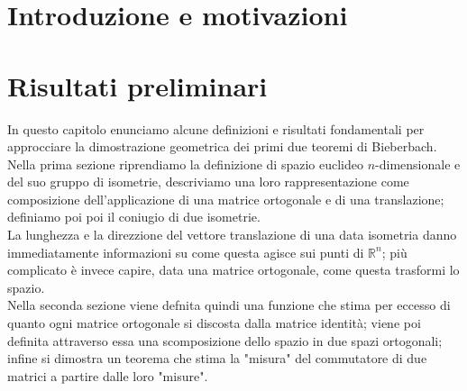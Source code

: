 \documentclass[12pt,a4paper]{book}
\author{Elisa Caruso}
\begin{document}
 

\chapter*{Introduzione e motivazioni}



\chapter{Risultati preliminari}
In questo capitolo enunciamo alcune definizioni e risultati fondamentali per approcciare la dimostrazione geometrica dei primi due teoremi di Bieberbach.  \\

Nella prima sezione riprendiamo la definizione di spazio euclideo $n$-dimensionale e del suo gruppo di isometrie, descriviamo una loro rappresentazione come composizione dell'applicazione di una matrice ortogonale e di una translazione; definiamo poi poi il coniugio di due isometrie. \\
La lunghezza e la direzzione del vettore translazione di una data isometria danno immediatamente informazioni su come questa agisce sui punti di $\mathbb{R}^n$; più complicato è invece capire, data una matrice ortogonale, come questa trasformi lo spazio. \\
Nella seconda sezione viene defnita quindi una funzione che stima per eccesso di quanto ogni matrice ortogonale si discosta dalla matrice identità; viene poi definita attraverso essa una scomposizione dello spazio in due spazi ortogonali; infine si dimostra un teorema che stima la "misura" del commutatore di due matrici a partire dalle loro "misure".  
\end{document}
